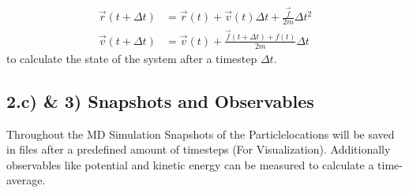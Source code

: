 \begin{align}
\vec{r}(t+\Delta t) &= \vec{r}(t) + \vec{v}(t)\Delta t+\frac{\vec{f}}{2m}\Delta t^2 \\
\vec{v}(t+\Delta t) &= \vec{v}(t) + \frac{\vec{f}(t+\Delta t) + f(t)}{2m}\Delta t
\end{align}
to calculate the state of the system after a timestep $\Delta t$. 

\subsection*{2.c) \& 3) Snapshots and Observables}

Throughout the MD Simulation Snapshots of the Particlelocations will be saved in files after a predefined amount of timesteps (For Visualization). Additionally observables like potential and kinetic energy can be measured to calculate a time-average.